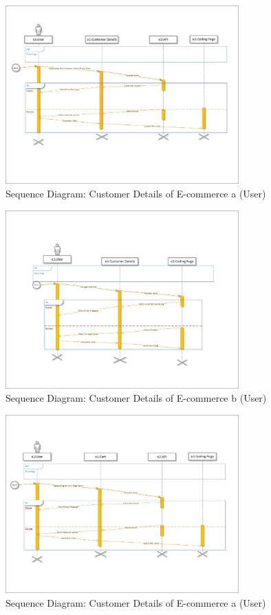 \documentclass[12pt]{report}
\begin{document}
\begin{figure}[ht]
    \centering
    \includegraphics[width=0.8\textwidth]{Media/s1_Page_10.jpg} %
    \caption{Sequence Diagram: Customer Details of E-commerce a (User)}
    \label{fig:drawing1}
\end{figure}

\begin{figure}[ht]
    \centering
    \includegraphics[width=0.8\textwidth]{Media/s1_Page_11.jpg} %
    \caption{Sequence Diagram: Customer Details of E-commerce b (User)}
    \label{fig:drawing1}
\end{figure}

\begin{figure}[ht]
    \centering
    \includegraphics[width=0.8\textwidth]{Media/s1_Page_12.jpg} %
    \caption{Sequence Diagram: Customer Details of E-commerce a (User)}
    \label{fig:drawing1}
\end{figure}
\end{document}
